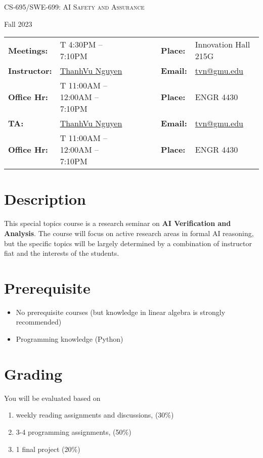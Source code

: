 \documentclass[11pt, a4paper]{article}
\begin{document}
\begin{center}
{\Large \textsc{CS-695/SWE-699: AI Safety and Assurance}}
\end{center}
\begin{center}
Fall 2023
\end{center}

\begin{center}
\begin{minipage}[t]{.75\textwidth}
\begin{tabular}{llcccll}
  \toprule
  \textbf{Meetings:} & T 4:30PM -- 7:10PM  & & & & \textbf{Place:} & Innovation Hall 215G\\
\textbf{Instructor:} & \href{https://go.gmu.edu/tvn}{ThanhVu Nguyen} & & &  & \textbf{Email:} &  \href{mailto:tvn@gmu.edu}{tvn@gmu.edu}\\
\textbf{Office Hr:} & T 11:00AM -- 12:00AM -- 7:10PM  & & & & \textbf{Place:} & ENGR 4430\\
\midrule
\textbf{TA:} & \href{https://go.gmu.edu/tvn}{ThanhVu Nguyen} & & &  & \textbf{Email:} &  \href{mailto:tvn@gmu.edu}{tvn@gmu.edu}\\
\textbf{Office Hr:} & T 11:00AM -- 12:00AM -- 7:10PM  & & & & \textbf{Place:} & ENGR 4430\\
\bottomrule
\end{tabular}
\end{minipage}
\end{center}


\section*{Description}
This special topics course is a research seminar on \textbf{\textbf{AI Verification and Analysis}}.
The course will focus on active research areas in formal AI reasoning,
but the specific topics will be largely determined by a
combination of instructor fiat and the interests of the students.

\section*{Prerequisite}
\begin{itemize}
\item No prerequisite courses (but knowledge in linear algebra is strongly recommended)
\item Programming knowledge (Python)
\end{itemize}


\section*{Grading}
You will be evaluated based on
\begin{enumerate}
\item weekly reading assignments and discussions, (30\%)
\item 3-4 programming assignments,  (50\%)
\item 1 final project  (20\%)
\end{enumerate}
\end{document}
